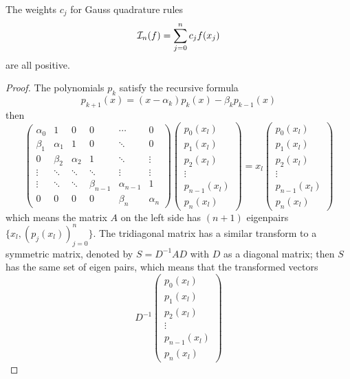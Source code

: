 \begin{theorem}
\label{Thm: 3-GAU-WEI-POS}
    The weights $c_j$ for Gauss quadrature rules 
    \begin{equation}
        \mathcal I_n(f) = \sum_{j = 0}^n c_j f(x_j)
    \end{equation}
    are all positive. 
\end{theorem}
\begin{proof}
   The polynomials $p_k$ satisfy the recursive formula 
   $$p_{k+1}(x) = (x - \alpha_k) p_k(x) - \beta_k p_{k-1}(x)$$
   then 
   \begin{equation}
       \begin{pmatrix}
           \alpha_0 & 1 & 0 & 0 & \cdots & 0\\
           \beta_1 & \alpha_1 & 1 & 0 & \ddots & 0\\ 
           0 & \beta_2 & \alpha_2 &  1 & \ddots & \vdots  \\
           \vdots & \ddots & \ddots & \ddots & \vdots & \vdots \\
           \vdots & \ddots & \ddots & \beta_{n-1} & \alpha_{n-1} & 1 \\
           0 & 0 & 0 & 0 & \beta_n & \alpha_n
       \end{pmatrix}\begin{pmatrix}
           p_0(x_l) \\ p_1(x_l) \\ p_2(x_l) \\ \vdots \\ p_{n-1}(x_l) \\ p_n(x_l)
       \end{pmatrix} = x_l \begin{pmatrix}
        p_0(x_l) \\ p_1(x_l) \\  p_2(x_l) \\ \vdots \\ p_{n-1}(x_l) \\ p_n(x_l)
    \end{pmatrix}
   \end{equation}
   which means the matrix $A$ on the left side has $(n+1)$ eigenpairs $\{ x_l, (p_j(x_l))_{j=0}^n\} $. The tridiagonal matrix has a similar transform to a symmetric matrix, denoted by $S = D^{-1}A D$ with $D$ as a diagonal matrix; then $S$ has the same set of eigen pairs, which means that the transformed vectors 
   \begin{equation}
       D^{-1} \begin{pmatrix}
        p_0(x_l) \\ p_1(x_l) \\  p_2(x_l) \\ \vdots \\ p_{n-1}(x_l) \\ p_n(x_l)

\end{pmatrix}
\end{equation}
\end{proof}

